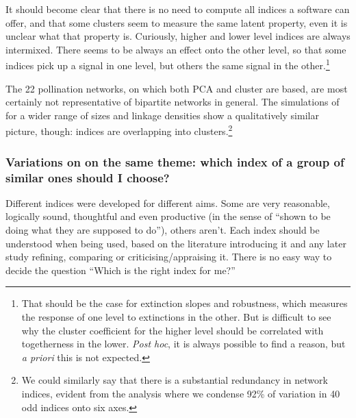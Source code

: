 \documentclass[a4paper, 11pt]{article}\usepackage[]{graphicx}\usepackage[]{color}
\begin{document}
It should become clear that there is no need to compute all indices a software can offer, and that some clusters seem to measure the same latent property, even it is unclear what that property is. Curiously, higher and lower level indices are always intermixed. There seems to be always an effect onto the other level, so that some indices pick up a signal in one level, but others the same signal in the other.\footnote{That should be the case for extinction slopes and robustness, which measures the response of one level to extinctions in the other. But is difficult to see why the cluster coefficient for the higher level should be correlated with togetherness in the lower. \emph{Post hoc}, it is always possible to find a reason, but \emph{a priori} this is not expected.}

The 22 pollination networks, on which both PCA and cluster are based, are most certainly not representative of bipartite networks in general. The simulations of \citet{Dormann2009} for a wider range of sizes and linkage densities show a qualitatively similar picture, though: indices are overlapping into clusters.\footnote{We could similarly say that there is a substantial redundancy in network indices, evident from the analysis where we condense 92\% of variation in 40 odd indices onto six axes.}



\subsubsection{Variations on on the same theme: which index of a group of similar ones should I choose?}


Different indices were developed for different aims. Some are very reasonable, logically sound, thoughtful and even productive (in the sense of ``shown to be doing what they are supposed to do''), others aren't. Each index should be understood when being used, based on the literature introducing it and any later study refining, comparing or criticising/appraising it. There is no easy way to decide the question ``Which is the right index for me?''
\end{document}
